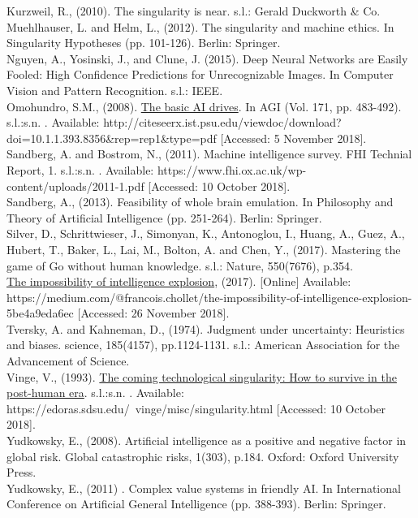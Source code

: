 \documentclass[11pt]{article}
\begin{document}
Kurzweil, R., (2010). The singularity is near. s.l.: Gerald Duckworth \& Co.\\

Muehlhauser, L. and Helm, L., (2012). The singularity and machine ethics. In Singularity Hypotheses (pp. 101-126). Berlin: Springer.\\

Nguyen, A., Yosinski, J., and Clune, J. (2015). Deep Neural Networks are Easily Fooled: High Confidence Predictions for Unrecognizable Images. In Computer Vision and Pattern Recognition. s.l.: IEEE.\\

Omohundro, S.M., (2008). \underline{The basic AI drives}. In AGI (Vol. 171, pp. 483-492). s.l.:s.n. . Available: http://citeseerx.ist.psu.edu/viewdoc/download?doi=10.1.1.393.8356\&rep=rep1\&type=pdf [Accessed: 5 November 2018].\\


Sandberg, A. and Bostrom, N., (2011). Machine intelligence survey. FHI Technial Report, 1. s.l.:s.n. . Available: https://www.fhi.ox.ac.uk/wp-content/uploads/2011-1.pdf [Accessed: 10 October 2018]. \\

Sandberg, A., (2013). Feasibility of whole brain emulation. In Philosophy and Theory of Artificial Intelligence (pp. 251-264). Berlin: Springer. \\

Silver, D., Schrittwieser, J., Simonyan, K., Antonoglou, I., Huang, A., Guez, A., Hubert, T., Baker, L., Lai, M., Bolton, A. and Chen, Y., (2017). Mastering the game of Go without human knowledge. s.l.: Nature, 550(7676), p.354. \\

\underline{The impossibility of intelligence explosion}, (2017). [Online] Available: https://medium.com/@francois.chollet/the-impossibility-of-intelligence-explosion-5be4a9eda6ec [Accessed: 26 November 2018]. \\

Tversky, A. and Kahneman, D., (1974). Judgment under uncertainty: Heuristics and biases. science, 185(4157), pp.1124-1131. s.l.: American Association for the Advancement of Science.\\

Vinge, V., (1993). \underline{The coming technological singularity: How to survive in the post-human era}. s.l.:s.n. . Available: https://edoras.sdsu.edu/~vinge/misc/singularity.html [Accessed: 10 October 2018].\\

Yudkowsky, E., (2008). Artificial intelligence as a positive and negative factor in global risk. Global catastrophic risks, 1(303), p.184. Oxford: Oxford University Press.\\

Yudkowsky, E., (2011) . Complex value systems in friendly AI. In International Conference on Artificial General Intelligence (pp. 388-393). Berlin: Springer. \\ 
\end{document}

